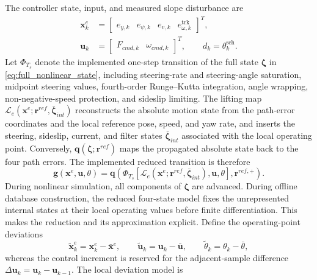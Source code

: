 \documentclass{ieeeaccess}
\begin{document}
The controller state, input, and measured slope disturbance are
\begin{equation}
\begin{aligned}
\bm{x}^{e}_k
&=\begin{bmatrix}e_{y,k}&e_{\psi,k}&e_{v,k}&e_{\omega,k}^{\mathrm{trk}}\end{bmatrix}^{T},\\
\bm{u}_k
&=\begin{bmatrix}F_{cmd,k}&\omega_{cmd,k}\end{bmatrix}^{T},
\qquad d_k=\theta^{\mathrm{sch}}_k .
\end{aligned}
\label{eq:discrete_error_state}
\end{equation}
Let $\Phi_{T_s}$ denote the implemented one-step transition of the full state $\bm\zeta$ in \eqref{eq:full_nonlinear_state}, including steering-rate and steering-angle saturation, midpoint steering values, fourth-order Runge--Kutta integration, angle wrapping, non-negative-speed protection, and sideslip limiting. The lifting map $\mathcal L_e(\bm x^e;\bm r^{ref},\bar{\bm\zeta}_{int})$ reconstructs the absolute motion state from the path-error coordinates and the local reference pose, speed, and yaw rate, and inserts the steering, sideslip, current, and filter states $\bar{\bm\zeta}_{int}$ associated with the local operating point. Conversely, $\bm q(\bm\zeta;\bm r^{ref})$ maps the propagated absolute state back to the four path errors. The implemented reduced transition is therefore
\begin{equation}
\bm g(\bm x^e,\bm u,\theta)
=\bm q\!\left(
\Phi_{T_s}\!\left[
\mathcal L_e(\bm x^e;\bm r^{ref},\bar{\bm\zeta}_{int}),
\bm u,\theta\right],\bm r^{ref,+}
\right).
\label{eq:implemented_error_transition}
\end{equation}
During nonlinear simulation, all components of $\bm\zeta$ are advanced. During offline database construction, the reduced four-state model fixes the unrepresented internal states at their local operating values before finite differentiation. This makes the reduction and its approximation explicit. Define the operating-point deviations
\begin{equation}
\widetilde{\bm x}^{e}_k=\bm x^e_k-\bar{\bm x}^{e},\qquad
\widetilde{\bm u}_k=\bm u_k-\bar{\bm u},\qquad
\widetilde\theta_k=\theta_k-\bar\theta,
\label{eq:operating_point_deviations}
\end{equation}
whereas the control increment is reserved for the adjacent-sample difference $\Delta\bm u_k=\bm u_k-\bm u_{k-1}$. The local deviation model is
\end{document}
